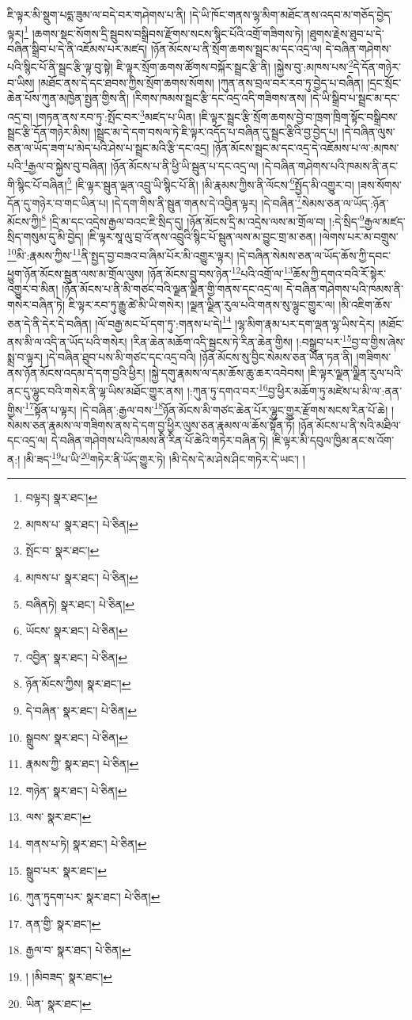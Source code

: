 ཇི་ལྟར་མི་སྡུག་པདྨ་ཟུམ་ལ་བདེ་བར་གཤེགས་པ་ནི། །དེ་ཡི་ཁོང་གནས་ལྷ་མིག་མཐོང་ནས་འདབ་མ་གཅོད་བྱེད་ལྟར།\footnote{བལྟར།  སྣར་ཐང་། } །ཆགས་སྡང་སོགས་དྲི་སྦུབས་བསྒྲིབས་རྫོགས་སངས་སྙིང་པོའི་འགྲོ་གཟིགས་ཏེ། །ཐུགས་རྗེས་ཐུབ་པ་དེ་བཞིན་སྒྲིབ་པ་དེ་ནི་འཇོམས་པར་མཛད། །ཉོན་མོངས་པ་ནི་སྲོག་ཆགས་སྦྲང་མ་དང་འདྲ་ལ། དེ་བཞིན་གཤེགས་པའི་སྙིང་པོ་ནི་སྦྲང་རྩི་ལྟ་བུ་སྟེ། ཇི་ལྟར་སྲོག་ཆགས་ཚོགས་བསྐོར་སྦྲང་རྩི་ནི། །སྐྱེས་བུ་:མཁས་པས་\footnote{མཁས་པ་  སྣར་ཐང་།  པེ་ཅིན། }དེ་དོན་གཉེར་བ་ཡིས། །མཐོང་ནས་དེ་དང་ཐབས་ཀྱིས་སྲོག་ཆགས་སོགས། །ཀུན་ནས་བྲལ་བར་རབ་ཏུ་བྱེད་པ་བཞིན། །དྲང་སྲོང་ཆེན་པོས་ཀུན་མཁྱེན་སྤྱན་གྱིས་ནི། །རིགས་ཁམས་སྦྲང་རྩི་དང་འདྲ་འདི་གཟིགས་ནས། །དེ་ཡི་སྒྲིབ་པ་སྦྲང་མ་དང་འདྲ་བ། །གཏན་ནས་རབ་ཏུ་:སྤོང་བར་\footnote{སྤོང་བ་  སྣར་ཐང་། }མཛད་པ་ཡིན། །ཇི་ལྟར་སྦྲང་རྩི་སྲོག་ཆགས་བྱེ་བ་ཁྲག་ཁྲིག་སྟོང་བསྒྲིབས་སྦྲང་རྩི་དོན་གཉེར་མིས། །སྦྲང་མ་དེ་དག་བསལ་ཏེ་ཇི་ལྟར་འདོད་པ་བཞིན་དུ་སྦྲང་རྩིའི་བྱ་བྱེད་པ། །དེ་བཞིན་ལུས་ཅན་ལ་ཡོད་ཟག་པ་མེད་པའི་ཤེས་པ་སྦྲང་མའི་རྩི་དང་འདྲ། །ཉོན་མོངས་སྦྲང་མ་དང་འདྲ་དེ་འཇོམས་པ་ལ་:མཁས་པའི་\footnote{མཁས་པ་  སྣར་ཐང་།  པེ་ཅིན། }རྒྱལ་བ་སྐྱེས་བུ་བཞིན། །ཉོན་མོངས་པ་ནི་ཕྱི་ཡི་སྦུན་པ་དང་འདྲ་ལ། །དེ་བཞིན་གཤེགས་པའི་ཁམས་ནི་ནང་གི་སྙིང་པོ་བཞིན།\footnote{བཞིནཏེ།  སྣར་ཐང་།  པེ་ཅིན། } །ཇི་ལྟར་སྦུན་ལྡན་འབྲུ་ཡི་སྙིང་པོ་ནི། །མི་རྣམས་ཀྱིས་ནི་ལོངས་\footnote{ཡོངས་  སྣར་ཐང་།  པེ་ཅིན། }སྤྱོད་མི་འགྱུར་བ། །ཟས་སོགས་དོན་དུ་གཉེར་བ་གང་ཡིན་པ། །དེ་དག་གིས་ནི་སྦུན་གནས་དེ་འབྱིན་ལྟར། །དེ་བཞིན་\footnote{འབྱིན་  སྣར་ཐང་།  པེ་ཅིན། }སེམས་ཅན་ལ་ཡོད་:ཉོན་མོངས་ཀྱི།\footnote{ཉོན་མོངས་ཀྱིས།  སྣར་ཐང་། } །དྲི་མ་དང་འདྲེས་རྒྱལ་བའང་ཇི་སྲིད་དུ། །ཉོན་མོངས་དྲི་མ་འདྲེས་ལས་མ་གྲོལ་བ། །:དེ་སྲིད་\footnote{དེ་བཞིན་  སྣར་ཐང་།  པེ་ཅིན། }རྒྱལ་མཛད་སྲིད་གསུམ་དུ་མི་བྱེད། །ཇི་ལྟར་སཱ་ལུ་བྲ་འོ་ནས་འབྲུའི་སྙིང་པོ་སྦུན་ལས་མ་བྱུང་གྲ་མ་ཅན། །ལེགས་པར་མ་བགྲུས་\footnote{སྒྲུབས་  སྣར་ཐང་།  པེ་ཅིན། }མི་:རྣམས་ཀྱིས་\footnote{རྣམས་ཀྱི་  སྣར་ཐང་།  པེ་ཅིན། }ནི་སྤྱད་བྱ་བཟའ་བ་ཞིམ་པོར་མི་འགྱུར་ལྟར། །དེ་བཞིན་སེམས་ཅན་ལ་ཡོད་ཆོས་ཀྱི་དབང་ཕྱུག་ཉོན་མོངས་སྦུན་ལས་མ་གྲོལ་ལུས། །ཉོན་མོངས་བྲུ་བས་ཉེན་\footnote{གཉེན་  སྣར་ཐང་།  པེ་ཅིན། }པའི་འགྲོ་ལ་\footnote{ལས་  སྣར་ཐང་། }ཆོས་ཀྱི་དགའ་བའི་རོ་སྟེར་འགྱུར་བ་མིན། །ཉོན་མོངས་པ་ནི་མི་གཙང་བའི་ལྗན་ལྗིན་གྱི་གནས་དང་འདྲ་ལ། དེ་བཞིན་གཤེགས་པའི་ཁམས་ནི་གསེར་བཞིན་ཏེ། ཇི་ལྟར་རབ་ཏུ་རྒྱུ་ཚེ་མི་ཡི་གསེར། །ལྗན་ལྗིན་རུལ་པའི་གནས་སུ་ལྷུང་གྱུར་ལ། །མི་འཇིག་ཆོས་ཅན་དེ་ནི་དེར་དེ་བཞིན། །ལོ་བརྒྱ་མང་པོ་དག་ཏུ་:གནས་པ་དེ།\footnote{གནས་པ་ཏེ།  སྣར་ཐང་།  པེ་ཅིན། } །ལྷ་མིག་རྣམ་པར་དག་ལྡན་ལྷ་ཡིས་དེར། །མཐོང་ནས་མི་ལ་འདི་ན་ཡོད་པའི་གསེར། །རིན་ཆེན་མཆོག་འདི་སྦྱངས་ཏེ་རིན་ཆེན་གྱིས། །:བསྒྲུབ་པར་\footnote{སྒྲུབ་པར་  སྣར་ཐང་། }བྱ་བ་གྱིས་ཞེས་སྨྲ་བ་ལྟར། །དེ་བཞིན་ཐུབ་པས་མི་གཙང་དང་འདྲ་བའི། །ཉོན་མོངས་སུ་བྱིང་སེམས་ཅན་ཡོན་ཏན་ནི། །གཟིགས་ནས་ཉོན་མོངས་འདམ་དེ་དག་བྱའི་ཕྱིར། །སྐྱེ་དགུ་རྣམས་ལ་དམ་ཆོས་ཆུ་ཆར་འབེབས། །ཇི་ལྟར་ལྗན་ལྗིན་རུལ་པའི་ནང་དུ་ལྷུང་བའི་གསེར་ནི་ལྷ་ཡིས་མཐོང་གྱུར་ནས། །:ཀུན་ཏུ་དགའ་བར་\footnote{ཀུན་ཏུདག་པར་  སྣར་ཐང་།  པེ་ཅིན། }བྱ་ཕྱིར་མཆོག་ཏུ་མཛེས་པ་མི་ལ་:ནན་གྱིས་\footnote{ནན་གྱི་  སྣར་ཐང་། }སྟོན་པ་ལྟར། །དེ་བཞིན་:རྒྱལ་བས་\footnote{རྒྱལ་བ་  སྣར་ཐང་།  པེ་ཅིན། }ཉོན་མོངས་མི་གཙང་ཆེན་པོར་ལྷུང་གྱུར་རྫོགས་སངས་རིན་པོ་ཆེ། །སེམས་ཅན་རྣམས་ལ་གཟིགས་ནས་དེ་དག་བྱ་ཕྱིར་ལུས་ཅན་རྣམས་ལ་ཆོས་སྟོན་ཏོ། །ཉོན་མོངས་པ་ནི་སའི་མཐིལ་དང་འདྲ་ལ། དེ་བཞིན་གཤེགས་པའི་ཁམས་ནི་རིན་པོ་ཆེའི་གཏེར་བཞིན་ཏེ། །ཇི་ལྟར་མི་དབུལ་ཁྱིམ་ནང་ས་འོག་ན:། །མི་ཟད་\footnote{། །མིབཟད་  སྣར་ཐང་། }པ་ཡི་\footnote{ཡིན་  སྣར་ཐང་། }གཏེར་ནི་ཡོད་གྱུར་ཏེ། །མི་དེས་དེ་མ་ཤེས་ཤིང་གཏེར་དེ་ཡང་། །
